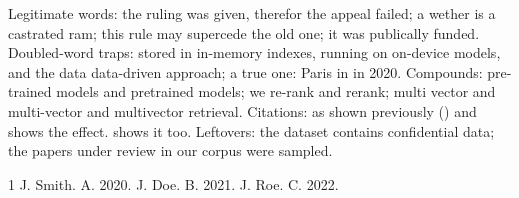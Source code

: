 \documentclass{article}
\begin{document}
Legitimate words: the ruling was given, therefor the appeal failed; a wether is a castrated ram; this rule may supercede the old one; it was publically funded.
Doubled-word traps: stored in in-memory indexes, running on on-device models, and the data data-driven approach; a true one: Paris in in 2020.
Compounds: pre-trained models and pretrained models; we re-rank and rerank; multi vector and multi-vector and multivector retrieval.
Citations: as shown previously (\citet{a}) and \citep{b} shows the effect. \cite{c} shows it too.
Leftovers: the dataset contains confidential data; the papers under review in our corpus were sampled.

\begin{thebibliography}{1}
 J. Smith. A. 2020.
 J. Doe. B. 2021.
 J. Roe. C. 2022.
\end{thebibliography}
\end{document}
